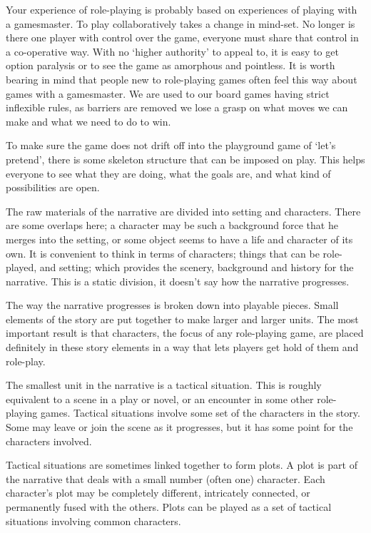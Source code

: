 \documentclass[twoside]{book}
\begin{document}
Your experience of role-playing is probably based on experiences of
playing with a gamesmaster. To play collaboratively takes a change in
mind-set. No longer is there one player with control over the game,
everyone must share that control in a co-operative way. With no
`higher authority' to appeal to, it is easy to get option paralysis or
to see the game as amorphous and pointless. It is worth bearing in
mind that people new to role-playing games often feel this way about
games with a gamesmaster. We are used to our board games having strict
inflexible rules, as barriers are removed we lose a grasp on what
moves we can make and what we need to do to win.

To make sure the game does not drift off into the playground game of
`let's pretend', there is some skeleton structure that can be imposed
on play. This helps everyone to see what they are doing, what the
goals are, and what kind of possibilities are open.

The raw materials of the narrative are divided into setting and
characters. There are some overlaps here; a character may be such a
background force that he merges into the setting, or some object seems
to have a life and character of its own. It is convenient to think in
terms of characters; things that can be role-played, and setting;
which provides the scenery, background and history for the
narrative. This is a static division, it doesn't say how the narrative
progresses.

The way the narrative progresses is broken down into playable
pieces. Small elements of the story are put together to make larger
and larger units. The most important result is that characters, the
focus of any role-playing game, are placed definitely in these story
elements in a way that lets players get hold of them and role-play.

The smallest unit in the narrative is a tactical situation. This is
roughly equivalent to a scene in a play or novel, or an encounter in
some other role-playing games. Tactical situations involve some set of
the characters in the story. Some may leave or join the scene as it
progresses, but it has some point for the characters involved.

Tactical situations are sometimes linked together to form plots. A
plot is part of the narrative that deals with a small number (often
one) character. Each character's plot may be completely different,
intricately connected, or permanently fused with the others. Plots can
be played as a set of tactical situations involving common characters.
\end{document}
